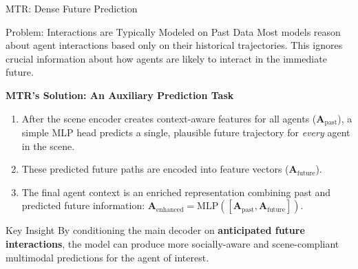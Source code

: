 \documentclass[10pt,aspectratio=169]{beamer}
\begin{document}
\begin{frame}{MTR: Dense Future Prediction}
    \begin{block}{Problem: Interactions are Typically Modeled on Past Data}
        Most models reason about agent interactions based only on their historical trajectories. This ignores crucial information about how agents are likely to interact in the immediate future.
    \end{block}
    
    \textbf{MTR's Solution: An Auxiliary Prediction Task}
    \begin{enumerate}
        \item After the scene encoder creates context-aware features for all agents ($\mathbf{A}_{\text{past}}$), a simple MLP head predicts a single, plausible future trajectory for \emph{every} agent in the scene.
        \item These predicted future paths are encoded into feature vectors ($\mathbf{A}_{\text{future}}$).
        \item The final agent context is an enriched representation combining past and predicted future information: $\mathbf{A}_{\text{enhanced}} = \text{MLP}([\mathbf{A}_{\text{past}}, \mathbf{A}_{\text{future}}])$.
    \end{enumerate}

    \begin{alertblock}{Key Insight}
        By conditioning the main decoder on \textbf{anticipated future interactions}, the model can produce more socially-aware and scene-compliant multimodal predictions for the agent of interest.
    \end{alertblock}
\end{frame}
\end{document}
